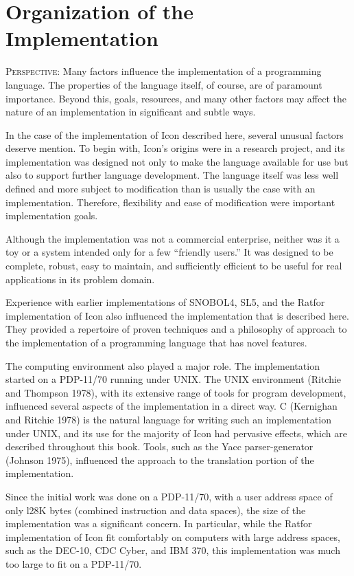 \chapter{Organization of the Implementation}
\label{Org-Chapter}

\textsc{Perspective}: Many factors influence the implementation of a
programming language. The properties of the language itself, of
course, are of paramount importance. Beyond this, goals, resources,
and many other factors may affect the nature of an implementation in
significant and subtle ways.

In the case of the implementation of Icon described here, several
unusual factors deserve mention. To begin with, Icon's origins were in
a research project, and its implementation was designed not only to
make the language available for use but also to support further
language development. The language itself was less well defined and
more subject to modification than is usually the case with an
implementation. Therefore, flexibility and ease of modification were
important implementation goals.

Although the implementation was not a commercial enterprise, neither
was it a toy or a system intended only for a few ``friendly users.''
It was designed to be complete, robust, easy to maintain, and
sufficiently efficient to be useful for real applications in its
problem domain.

Experience with earlier implementations of SNOBOL4, SL5, and the
Ratfor implementation of Icon also influenced the implementation that
is described here. They provided a repertoire of proven techniques and
a philosophy of approach to the implementation of a programming
language that has novel features.

The computing environment also played a major role. The implementation
started on a PDP-11/70 running under UNIX. The UNIX environment
(Ritchie and Thompson 1978), with its extensive range of tools for
program development, influenced several aspects of the implementation
in a direct way. C (Kernighan and Ritchie 1978) is the natural
language for writing such an implementation under UNIX, and its use
for the majority of Icon had pervasive effects, which are described
throughout this book. Tools, such as the Yacc parser-generator
(Johnson 1975), influenced the approach to the translation portion of
the implementation.

Since the initial work was done on a PDP-11/70, with a user address
space of only l28K bytes (combined instruction and data spaces), the
size of the implementation was a significant concern. In particular,
while the Ratfor implementation of Icon fit comfortably on computers
with large address spaces, such as the DEC-10, CDC Cyber, and IBM 370,
this implementation was much too large to fit on a PDP-11/70.

